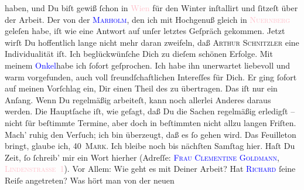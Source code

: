                haben, und Du biſt gewiß ſchon in \textcolor{pink}{Wien}{}\ledrightnote{\textcolor{pink}{Wien}} für den
               Winter inſtallirt und ſitzeſt über der Arbeit. Der \label{K_mets_Goldmann_94-partII-999v}\label{K_mets_Goldmann_94-partII-999h}{ }{\pb}von der \textsc{\textcolor{blue}{Marholm}{}\ledrightnote{\textcolor{blue}{Laura Marholm}}}, den ich mit Hochgenuß gleich in \textsc{\textcolor{pink}{Nuernberg}{}\ledrightnote{\textcolor{pink}{Nürnberg}}} geleſen habe, iſt  wie eine Antwort auf unſer
               letztes Geſpräch gekommen. Jetzt wirſt Du hoffentlich lange nicht mehr daran
               zweifeln, daß \textsc{Arthur Schnitzler} eine Individualität iſt.
               Ich beglückwünſche Dich zu dieſem schönen Erfolge.\pend
           \pstart
           Mit  meinem \textcolor{blue}{Onkel}{}habe ich ſofort geſprochen. Ich habe ihn unerwartet
               liebevoll und warm vorgefunden, auch voll ſreundſchaftlichen Intereſſes für Dich. Er
               ging ſofort auf meinen Vorſchlag ein, Dir einen Theil des \label{K_L02612-2v}\label{K_L02612-2h} zu übertragen. Das iſt nur ein
               Anſang. Wenn Du regelmäßig arbeiteſt, kann noch {\pb}allerlei Anderes daraus werden. Die Hauptſache iſt, wie geſagt, daß Du die Sachen
               regelmäßig erledigſt – nicht ſür beſtimmte Termine, aber doch in beſtimmten nicht
               allzu langen Friſten. Mach’ ruhig den Verſuch; ich bin überzeugt, daß es ſo gehen
               wird. Das Feuilleton bringt, {\pb}glaube ich, \textsc{40 Mark}.\pend
           \pstart
           Ich bleibe noch bis nächſten Samſtag hier. Haſt Du
               Zeit, ſo ſchreib’ mir ein Wort hierher (Adreſſe: \textsc{\textcolor{blue}{Frau Clementine Goldmann}{}\ledrightnote{\textcolor{blue}{Clementine Goldmann}}}, \textsc{\textcolor{pink}{Lindenstraße 1}{}\ledrightnote{\textcolor{pink}{Lindenstraße}}}). Vor Allem: Wie geht es mit Deiner Arbeit? Hat \textsc{\textcolor{blue}{Richard}{}\ledrightnote{\textcolor{blue}{Richard Beer-Hofmann}}}{ }{\pb}ſeine Reiſe angetreten? Was hört man von der neuen
